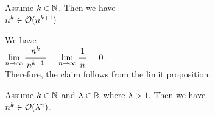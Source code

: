 \example
Assume $k \in {\mathbb N}$.  Then we have
\\[0.2cm]
\hspace*{1.3cm}
 $n^k \in \mathcal{O}(n^{k+1})$.
\ex
 
\proof
We have \\[0.2cm]
\hspace*{1.3cm} 
$\lim\limits_{n \rightarrow \infty} \bruch{n^{k}}{n^{k+1}} = \lim\limits_{n \rightarrow   \infty} \bruch{1}{n} = 0$.
\\[0.2cm]
Therefore, the claim follows from the limit proposition. 
\qeds

\example
Assume $k \in {\mathbb N}$ and $\lambda \in {\mathbb R}$ where $\lambda > 1$.  Then we have \\[0.2cm]
\hspace*{1.3cm} $n^k \in \mathcal{O}(\lambda^n)$.
\ex

